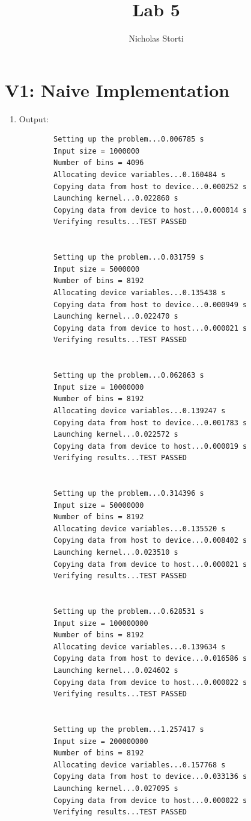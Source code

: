 \documentclass{article}
\title{Lab 5}
\author{Nicholas Storti}
\begin{document}
\maketitle

\section{V1: Naive Implementation}

\begin{enumerate}
	\item Output:
	\begin{verbatim}
		Setting up the problem...0.006785 s
		Input size = 1000000
		Number of bins = 4096
		Allocating device variables...0.160484 s
		Copying data from host to device...0.000252 s
		Launching kernel...0.022860 s
		Copying data from device to host...0.000014 s
		Verifying results...TEST PASSED
		
		
		Setting up the problem...0.031759 s
		Input size = 5000000
		Number of bins = 8192
		Allocating device variables...0.135438 s
		Copying data from host to device...0.000949 s
		Launching kernel...0.022470 s
		Copying data from device to host...0.000021 s
		Verifying results...TEST PASSED
		
		
		Setting up the problem...0.062863 s
		Input size = 10000000
		Number of bins = 8192
		Allocating device variables...0.139247 s
		Copying data from host to device...0.001783 s
		Launching kernel...0.022572 s
		Copying data from device to host...0.000019 s
		Verifying results...TEST PASSED
		
		
		Setting up the problem...0.314396 s
		Input size = 50000000
		Number of bins = 8192
		Allocating device variables...0.135520 s
		Copying data from host to device...0.008402 s
		Launching kernel...0.023510 s
		Copying data from device to host...0.000021 s
		Verifying results...TEST PASSED
		
		
		Setting up the problem...0.628531 s
		Input size = 100000000
		Number of bins = 8192
		Allocating device variables...0.139634 s
		Copying data from host to device...0.016586 s
		Launching kernel...0.024602 s
		Copying data from device to host...0.000022 s
		Verifying results...TEST PASSED
		
		
		Setting up the problem...1.257417 s
		Input size = 200000000
		Number of bins = 8192
		Allocating device variables...0.157768 s
		Copying data from host to device...0.033136 s
		Launching kernel...0.027095 s
		Copying data from device to host...0.000022 s
		Verifying results...TEST PASSED
	\end{verbatim}
	

\end{enumerate}
\end{document}
